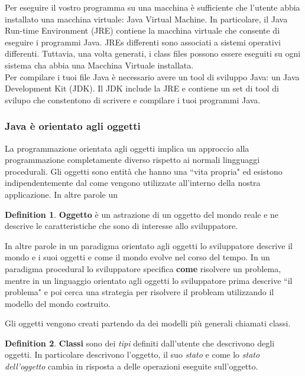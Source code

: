 \documentclass{article}
\theoremstyle{definition}
\newtheorem{mydef}{Definition}
\begin{document}
Per eseguire il vostro programma su una macchina \`e sufficiente che l'utente abbia installato una macchina virtuale: Java Virtual Machine. In particolare, il Java Run-time Environment (JRE) contiene la macchina virtuale che consente di eseguire i programmi Java.  JREs differenti sono associati a sistemi operativi differenti. Tuttavia, una volta generati, i class files possono essere eseguiti su ogni sistema cha abbia una Macchina Virtuale installata. \\
Per compilare i tuoi file Java \`e necessario avere un tool di sviluppo Java: un Java Development Kit (JDK). Il JDK include la JRE e contiene un set di tool di svilupo che constentono di scrivere e compilare i tuoi programmi Java.




\subsubsection{Java \`e orientato agli oggetti}
La programmazione orientata agli oggetti implica un approccio alla programmazione completamente diverso rispetto ai normali lingguaggi procedurali. Gli oggetti sono entit\`a che hanno una ``vita propria" ed esistono indipendentemente dal come vengono utilizzate all'interno della nostra applicazione. In altre parole un 

\begin{mydef} \textbf{Oggetto} \`e un astrazione di un oggetto del mondo reale e ne descrive le caratteristiche  che sono di interesse allo sviluppatore.
\end{mydef}

In altre parole in un paradigma orientato agli oggetti lo sviluppatore descrive il mondo e i suoi oggetti e come il mondo evolve nel corso del tempo. In un paradigma procedural lo sviluppatore specifica \textbf{come} risolvere un problema, mentre in un linguaggio orientato agli oggetti lo sviluppatore prima descrive ``il problema" e poi cerca una strategia per risolvere il probleam utilizzando il modello del mondo costruito.

Gli oggetti vengono creati partendo da dei modelli pi\`u generali chiamati classi. 

\begin{mydef} \textbf{Classi} sono dei \emph{tipi} definiti dall'utente che descrivono degli oggetti. In particolare descrivono l'oggetto, il suo \emph{stato} e come lo \emph{stato dell'oggetto} cambia in risposta a delle operazioni eseguite sull'oggetto.
\end{mydef}
\end{document}
